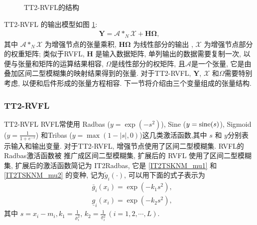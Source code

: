 \begin{figure} [!htbp]
\begin{center}
\caption{TT2-RVFL的结构}
\label{TensorRVFL20180927-2}
\end{center}
\end{figure}
TT2-RVFL 的输出模型如图 \ref{TensorRVFL20180927-2}:
\begin{align}
  \bm Y=\mathcal A *_N \mathcal X+\bm H \bm \Omega,\label{TensorRVFLEq05}
\end{align}
其中 $\mathcal A *_N \mathcal X$ 为增强节点的张量乘积, $\bm H \bm \Omega$ 为线性部分的输出 ,  $\mathcal X$ 为增强节点部分的权重矩阵;
类似于RVFL, $\bm H$ 是输入数据矩阵, 单列输出的数据需要复制一次, 以便与张量和矩阵的运算结果相容, $\Omega$是线性部分的权矩阵, 且$\mathcal A$是一个张量, 它是由 叠加区间二型模糊集的映射结果得到的张量.
对于TT2-RVFL, $\bm Y$, $\mathcal X$ 和$\Omega$需要特别考虑, 以便和后件形成的张量方程相容. 下一节将介绍由三个变量组成的张量结构.
\subsubsection{TT2-RVFL} {TT2-RVFL}
RVFL常使用 Radbas ($y = \exp(-s^2)$), Sine ($y = \textup{sine} (s)$), Sigmoid ($y = \frac 1 {1+e^{-s} } $) 和Tribas ($y = \max(1 - |s|, 0)$)这几类激活函数,其中 $s$ 和 $y$分别表示输入和输出变量.
对于TT2-RVFL, 增强节点使用了区间二型模糊集. RVFL的 Radbas激活函数被 推广成区间二型模糊集, 扩展后的 RVFL 使用了区间二型模糊集, 扩展后的激活函数简记为 IT2Radbas, 它是 \eqref{IT2TSKNM_mu1} 和 \eqref{IT2TSKNM_mu2} 的变种,  记为$\tilde g_i(\cdot)$, 可以用下面的式子表示为
 \begin{align}
  &\bar{g} _{i} (x_i)=\exp(-k_1 s^2),\label{IT2TSKNM_g1} \\
  &\underline{g} _{i} (x_i)=\exp(-k_2 s^2),\label{IT2TSKNM_g2}
\end{align}
其中 $s=x_i-m_{i} , k_1=\frac{1} {\bar{\sigma} ^2_{i} } $, $k_2=\frac{1} {\underline{\sigma} ^2_{i} } \, (i=1,2,\cdots, L)$.

